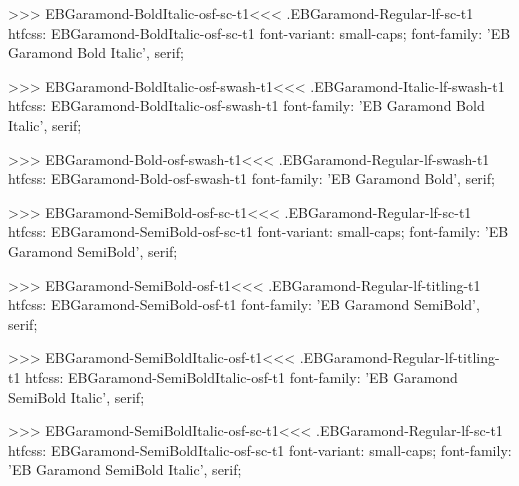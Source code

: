 {{{{{{{>>>
\<EBGaramond-BoldItalic-osf-sc-t1\><<<
.EBGaramond-Regular-lf-sc-t1
htfcss:  EBGaramond-BoldItalic-osf-sc-t1  font-variant: small-caps; font-family: 'EB Garamond Bold Italic', serif;

>>>
\<EBGaramond-BoldItalic-osf-swash-t1\><<<
.EBGaramond-Italic-lf-swash-t1
htfcss:  EBGaramond-BoldItalic-osf-swash-t1  font-family: 'EB Garamond Bold Italic', serif;

>>>
\<EBGaramond-Bold-osf-swash-t1\><<<
.EBGaramond-Regular-lf-swash-t1
htfcss:  EBGaramond-Bold-osf-swash-t1  font-family: 'EB Garamond Bold', serif;

>>>
\<EBGaramond-SemiBold-osf-sc-t1\><<<
.EBGaramond-Regular-lf-sc-t1
htfcss:  EBGaramond-SemiBold-osf-sc-t1  font-variant: small-caps; font-family: 'EB Garamond SemiBold', serif;

>>>
\<EBGaramond-SemiBold-osf-t1\><<<
.EBGaramond-Regular-lf-titling-t1
htfcss:  EBGaramond-SemiBold-osf-t1  font-family: 'EB Garamond SemiBold', serif;

>>>
\<EBGaramond-SemiBoldItalic-osf-t1\><<<
.EBGaramond-Regular-lf-titling-t1
htfcss:  EBGaramond-SemiBoldItalic-osf-t1  font-family: 'EB Garamond SemiBold Italic', serif;

>>>
\<EBGaramond-SemiBoldItalic-osf-sc-t1\><<<
.EBGaramond-Regular-lf-sc-t1
htfcss:  EBGaramond-SemiBoldItalic-osf-sc-t1  font-variant: small-caps; font-family: 'EB Garamond SemiBold Italic', serif;

}}}}}}}
